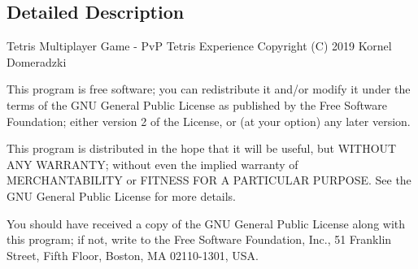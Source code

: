 \subsection{Detailed Description}
Tetris Multiplayer Game -\/ PvP Tetris Experience Copyright (C) 2019 Kornel Domeradzki

This program is free software; you can redistribute it and/or modify it under the terms of the G\+NU General Public License as published by the Free Software Foundation; either version 2 of the License, or (at your option) any later version.

This program is distributed in the hope that it will be useful, but W\+I\+T\+H\+O\+UT A\+NY W\+A\+R\+R\+A\+N\+TY; without even the implied warranty of M\+E\+R\+C\+H\+A\+N\+T\+A\+B\+I\+L\+I\+TY or F\+I\+T\+N\+E\+SS F\+OR A P\+A\+R\+T\+I\+C\+U\+L\+AR P\+U\+R\+P\+O\+SE. See the G\+NU General Public License for more details.

You should have received a copy of the G\+NU General Public License along with this program; if not, write to the Free Software Foundation, Inc., 51 Franklin Street, Fifth Floor, Boston, MA 02110-\/1301, U\+SA. 
